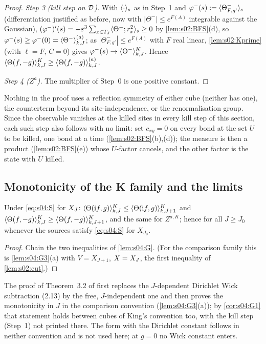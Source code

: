 \begin{proof}
\emph{Step 3 (kill step on $\mathcal D$).} With $\langle \cdot\rangle_s$ as in Step~1 and $\varphi^-(s):=\langle \Theta^-_{F,g'}\rangle_s$ (differentiation justified as before, now with $|\Theta^-|\le e^{F(A)}$ integrable against the Gaussian), $(\varphi^-)'(s)=-\varepsilon^3\sum_{x\in T_J}\langle \Theta^-;r_x^2\rangle_s\ge0$ by \cref{lem:s02:BFS}(d), so $\varphi^-(s)\ge\varphi^-(0)=\langle \Theta^-\rangle^{(a)}_{k,J}$; as $|\Theta^-_{F,g'}|\le e^{F(A)}$ with $F$ real linear, \cref{lem:s02:Kprime} (with $\ell=F$, $C=0$) gives $\varphi^-(s)\to\langle \Theta^-\rangle^{K}_{k,J}$. Hence $\langle \Theta(f,-g)\rangle^{K}_{k,J}\ge\langle \Theta(f,-g)\rangle^{(a)}_{k,J}$.

\emph{Step 4 ($Z^a$).} The multiplier of Step~0 is one positive constant.
\end{proof}

Nothing in the proof uses a reflection symmetry of either cube (neither has one), the counterterm beyond its site-independence, or the renormalisation group. Since the observable vanishes at the killed sites in every kill step of this section, each such step also follows with no limit: set $c_{xy}=0$ on every bond at the set $U$ to be killed, one bond at a time (\cref{lem:s02:BFS}(b),(d)); the measure is then a product (\cref{lem:s02:BFS}(e)) whose $U$-factor cancels, and the other factor is the state with $U$ killed.

\subsection{Monotonicity of the K family and the limits}

\begin{corollary}\label{cor:s04:G1}
Under \eqref{eq:s04:S} for $X_J$: $\langle \Theta(\mathrm if,g)\rangle^{K}_{k,J}\le\langle\Theta(\mathrm if,g)\rangle^K_{k,J+1}$ and $\langle \Theta(f,-g)\rangle^{K}_{k,J}\ge\langle\Theta(f,-g)\rangle^K_{k,J+1}$, and the same for $Z^{a,K}$; hence for all $J\ge J_0$ whenever the sources satisfy \eqref{eq:s04:S} for $X_{J_0}$.
\end{corollary}

\begin{proof}
Chain the two inequalities of \cref{lem:s04:G}. (For the comparison family this is \cref{lem:s04:G3}(a) with $V=X_{J+1}$, $X=X_J$, \ie the first inequality of \cref{lem:s02:cut}.)
\end{proof}

The proof of Theorem~3.2 of \cite{K2} first replaces the $J$-dependent Dirichlet Wick subtraction (2.13) by the free, $J$-independent one and then proves the monotonicity in $J$ in the comparison convention (\cref{lem:s04:G3}(a)); by \cref{cor:s04:G1} that statement holds between cubes of King's convention too, with the kill step (Step~1) not printed there. The form with the Dirichlet constant follows in neither convention and is not used here; at $g=0$ no Wick constant enters.

